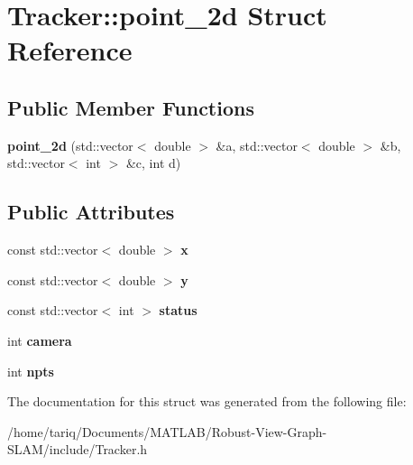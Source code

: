 \hypertarget{structTracker_1_1point__2d}{}\section{Tracker\+:\+:point\+\_\+2d Struct Reference}
\label{structTracker_1_1point__2d}
\subsection*{Public Member Functions}
\begin{DoxyCompactItemize}
\item 
{\bfseries point\+\_\+2d} (std\+::vector$<$ double $>$ \&a, std\+::vector$<$ double $>$ \&b, std\+::vector$<$ int $>$ \&c, int d)\hypertarget{structTracker_1_1point__2d_ab452d62cdc5f07e21dd3c1343d1f5951}{}\label{structTracker_1_1point__2d_ab452d62cdc5f07e21dd3c1343d1f5951}

\end{DoxyCompactItemize}
\subsection*{Public Attributes}
\begin{DoxyCompactItemize}
\item 
const std\+::vector$<$ double $>$ {\bfseries x}\hypertarget{structTracker_1_1point__2d_a7b5555f1e9d4459cd19b69190e68d4c4}{}\label{structTracker_1_1point__2d_a7b5555f1e9d4459cd19b69190e68d4c4}

\item 
const std\+::vector$<$ double $>$ {\bfseries y}\hypertarget{structTracker_1_1point__2d_aa226e7fc9461a164dc12e4f5d85f531a}{}\label{structTracker_1_1point__2d_aa226e7fc9461a164dc12e4f5d85f531a}

\item 
const std\+::vector$<$ int $>$ {\bfseries status}\hypertarget{structTracker_1_1point__2d_a2f457ea97e5cc7e4a8ba1aeffbad15ac}{}\label{structTracker_1_1point__2d_a2f457ea97e5cc7e4a8ba1aeffbad15ac}

\item 
int {\bfseries camera}\hypertarget{structTracker_1_1point__2d_a095f7164767f1e4f17a60c3856ddd75a}{}\label{structTracker_1_1point__2d_a095f7164767f1e4f17a60c3856ddd75a}

\item 
int {\bfseries npts}\hypertarget{structTracker_1_1point__2d_a891f773f43c2079df404f57aa8a9f5fb}{}\label{structTracker_1_1point__2d_a891f773f43c2079df404f57aa8a9f5fb}

\end{DoxyCompactItemize}


The documentation for this struct was generated from the following file\+:\begin{DoxyCompactItemize}
\item 
/home/tariq/\+Documents/\+M\+A\+T\+L\+A\+B/\+Robust-\/\+View-\/\+Graph-\/\+S\+L\+A\+M/include/Tracker.\+h\end{DoxyCompactItemize}
